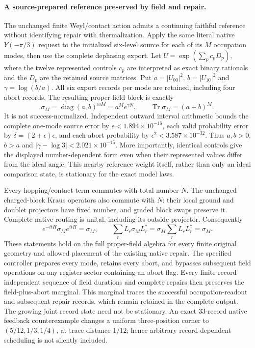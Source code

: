 \paragraph{A source-prepared reference preserved by field and repair.}
The unchanged finite Weyl/contact action admits a continuing faithful
reference without identifying repair with thermalization.  Apply the same
literal native $Y(-\pi/3)$ request to the initialized six-level source for
each of its $M$ occupation modes, then use the complete dephasing export.
Let $U=\exp(\sum_p c_pD_p)$, where the twelve represented controls $c_p$
are interpreted as exact binary rationals and the $D_p$ are the retained
source matrices.  Put $a=|U_{00}|^2$, $b=|U_{10}|^2$ and
$\gamma=\log(b/a)$.  All six export records per mode are retained,
including four abort records.  The resulting proper-field block is exactly
\[
 \sigma_M=\operatorname{diag}(a,b)^{\otimes M}
          =a^M e^{\gamma N},\qquad
 \operatorname{Tr}\sigma_M=(a+b)^M.
\]
It is not success-normalized.  Independent outward interval arithmetic
bounds the complete one-mode source error by
$\epsilon<1.894\times10^{-16}$, each valid probability error by
$\delta=(2+\epsilon)\epsilon$, and each abort probability by
$\epsilon^2<3.587\times10^{-32}$.  Thus $a,b>0$, $b>a$ and
$|\gamma-\log3|<2.021\times10^{-15}$.  More importantly, identical
controls give the displayed number-dependent form even when their
represented values differ from the ideal angle.  This nearby reference
weight itself, rather than only an ideal comparison state, is stationary
for the exact model laws.

Every hopping/contact term commutes with total number $N$.  The unchanged
charged-block Kraus operators also commute with $N$: their local ground
and doublet projectors have fixed number, and graded block swaps preserve
it.  Complete native routing is unital, including its outside projector.
Consequently
\[
 e^{-itH}\sigma_Me^{itH}=\sigma_M,\qquad
 \sum_r L_r\sigma_ML_r^*
 =\sigma_M\sum_r L_rL_r^*=\sigma_M.
\]
These statements hold on the full proper-field algebra for every finite
original geometry and allowed placement of the existing native repair.
The specified controller prepares every mode, retains every abort, and
bypasses subsequent field operations on any register sector containing an
abort flag.  Every finite record-independent sequence of field durations
and complete repairs then preserves the field-plus-abort marginal.
This marginal traces the successful occupation-readout and subsequent
repair records, which remain retained in the complete output.
The growing joint record state need not be stationary.  An exact
33-record native feedback counterexample changes a uniform three-position
corner to $(5/12,1/3,1/4)$, at trace distance $1/12$; hence arbitrary
record-dependent scheduling is not silently included.

